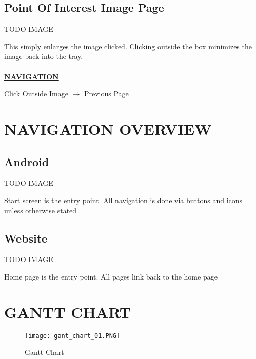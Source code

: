 \documentclass[12pt]{article}
\begin{document}
\subsection{Point Of Interest Image Page}
\par{TODO IMAGE}
\par{This simply enlarges the image clicked. Clicking outside the box minimizes the image back into the tray. \\ \\}
\textbf{\uline{NAVIGATION}}
\par{Click Outside Image $\rightarrow$ Previous Page}
\section{NAVIGATION OVERVIEW}
\subsection{Android}
\par{TODO IMAGE}
\par{Start screen is the entry point. All navigation is done via buttons and icons unless otherwise stated}
\subsection{Website}
\par{TODO IMAGE}
\par{Home page is the entry point. All pages link back to the home page}
\newpage
\section{GANTT CHART}
	\begin{figure}[htp]
	\begin{adjustwidth}{-3.cm}{}
\centering
\texttt{[image: gant\_chart\_01.PNG]}
\caption{Gantt Chart}
\label{Gantt Chart}
\end{adjustwidth}
\end{figure}
	
\newpage
\end{document}
